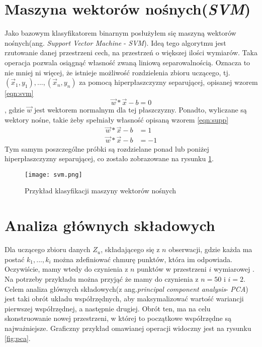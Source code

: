 \section{Maszyna wektorów nośnych(\textit{SVM})}

Jako bazowym klasyfikatorem binarnym posłużyłem się maszyną wektorów nośnych(ang. \textit{Support Vector Machine} - \textit{SVM}). Ideą tego algorytmu jest rzutowanie danej przestrzeni cech, na przestrzeń o większej ilości wymiarów. Taka operacja pozwala osiągnąć własność zwaną liniową separowalnością. Oznacza to nie mniej ni więcej, że istnieje możliwość rozdzielenia zbioru uczącego, tj. ${(\vec{x}_{1},y_{1}),...,(\vec{x}_{n},y_{n})}$ za pomocą hiperpłaszczyzny separującej, opisanej wzorem \ref{eqn:svm}
\begin{equation}
	\vec{w} * \vec{x}-b=0
	\label{eqn:svm}
\end{equation}
, gdzie $\vec{w}$ jest wektorem normalnym dla tej płaszczyzny. Ponadto, wyliczane są wektory nośne, takie żeby spełniały własność opisaną wzorem \ref{eqn:supp}
\begin{equation}
	\begin{split}
		\vec{w} * \vec{x}-b &=1 \\
		\vec{w} * \vec{x}-b &=-1
	\end{split}
	\label{eqn:supp}
\end{equation}
Tym samym poszczególne próbki są rozdzielane ponad lub poniżej hiperpłaszczyzny separującej, co zostało zobrazowane na rysunku \ref{fig:svm}.
\begin{figure}[h!]
	\texttt{[image: svm.png]}
	\centering
	\caption{Przykład klasyfikacji maszyny wektorów nośnych}
	\label{fig:svm}
\end{figure}

\section{Analiza głównych składowych}

Dla uczącego zbioru danych $Z_{u}$, składającego się z $n$ obserwacji, gdzie każda ma postać ${k_{1}, ..., k_{i}}$ można zdefiniować chmurę punktów, która im odpowiada. Oczywiście, mamy wtedy do czynienia z $n$ punktów w przestrzeni $i$ wymiarowej \cite{pca}. Na potrzeby przykładu można przyjąć że mamy do czynienia z $n=50$ i $i=2$. Celem analiza głównych składowych(z ang.\textit{principal component analysis}- \textit{PCA}) jest taki obrót układu współrzędnych, aby maksymalizować wartość wariancji pierwszej współrzędnej, a następnie drugiej. Obrót ten, ma na celu skonstruowanie nowej przestrzeni, w której to początkowe współrzędne są najważniejsze. Graficzny przykład omawianej operacji widoczny jest na rysunku \ref{fig:pca}.

